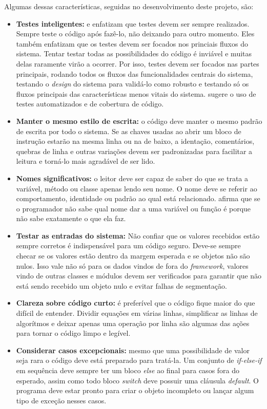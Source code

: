 Algumas dessas características, seguidas no desenvolvimento deste projeto, são:

\begin{itemize}
  \item \textbf{Testes inteligentes:} \cite{Goodliffe2007} e \cite{McConnel2004} enfatizam que testes devem ser sempre realizados. Sempre teste o código após fazê-lo, não deixando para outro momento. Eles também enfatizam que os testes devem ser focados nos princiais fluxos do sistema. Tentar testar todas as possibilidades do código é inviável e muitas delas raramente virão a ocorrer. Por isso, testes devem ser focados nas partes principais, rodando todos os fluxos das funcionalidades centrais do sistema, testando o \textit{design} do sistema para validá-lo como robusto e testando só os fluxos principais das características menos vitais do sistema. \cite{McConnel2004} sugere o uso de testes automatizados e de cobertura de código.
  \item \textbf{Manter o mesmo estilo de escrita:} o código deve manter o mesmo padrão de escrita por todo o sistema. Se as chaves usadas ao abrir um bloco de instrução estarão na mesma linha ou na de baixo, a identação, comentários, quebras de linha e outras variações devem ser padronizadas para facilitar a leitura e torná-lo mais agradável de ser lido.
  \item \textbf{Nomes significativos:} o leitor deve ser capaz de saber do que se trata a variável, método ou classe apenas lendo seu nome. O nome deve se referir ao comportamento, identidade ou padrão ao qual está relacionado. \cite{Goodliffe2007} afirma que se o programador não sabe qual nome dar a uma variável ou função é porque não sabe exatamente o que ela faz.
  \item \textbf{Testar as entradas do sistema:} Não confiar que os valores recebidos estão sempre corretos é indispensável para um código seguro. Deve-se sempre checar se os valores estão dentro da margem esperada e se objetos não são nulos. Isso vale não só para os dados vindos de fora do \textit{framework}, valores vindo de outras classes e módulos devem ser verificados para garantir que não está sendo recebido um objeto nulo e evitar falhas de segmentação.
  \item \textbf{Clareza sobre código curto:} é preferível que o código fique maior do que difícil de entender. Dividir equações em várias linhas, simplificar as linhas de algorítmos e deixar apenas uma operação por linha são algumas das ações para tornar o código limpo e legível.
  \item \textbf{Considerar casos excepcionais:} mesmo que uma possibilidade de valor seja rara o código deve está preparado para tratá-la. Um conjunto de \textit{if-else-if} em sequência deve sempre ter um bloco \textit{else} ao final para casos fora do esperado, assim como todo bloco \textit{switch} deve possuir uma cláusula \textit{default}. O programa deve estar pronto para criar o objeto incompleto ou lançar algum tipo de exceção nesses casos.

\end{itemize}
